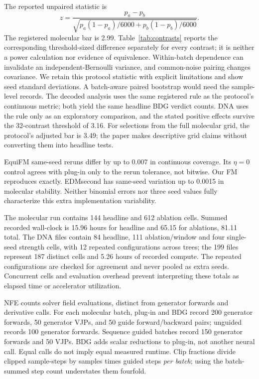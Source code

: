 \documentclass{article}
\begin{document}
The reported unpaired statistic is
\[
 z=\frac{p_a-p_b}{\sqrt{p_a(1-p_a)/6000+p_b(1-p_b)/6000}}.
\]
The registered molecular bar is 2.99. Table~\ref{tab:contrasts} reports the corresponding threshold-sized difference separately for every contrast; it is neither a power calculation nor evidence of equivalence. Within-batch dependence can invalidate an independent-Bernoulli variance, and common-noise pairing changes covariance. We retain this protocol statistic with explicit limitations and show seed standard deviations. A batch-aware paired bootstrap would need the sample-level records. The decoded analysis uses the same registered rule as the protocol's continuous metric; both yield the same headline BDG verdict counts. DNA uses the rule only as an exploratory comparison, and the stated positive effects survive the 32-contrast threshold of 3.16. For selections from the full molecular grid, the protocol's adjusted bar is 3.49; the paper makes descriptive grid claims without converting them into headline tests.

EquiFM same-seed reruns differ by up to 0.007 in continuous coverage. Its $\eta=0$ control agrees with plug-in only to the rerun tolerance, not bitwise. Our FM reproduces exactly. EDMsecond has same-seed variation up to 0.0015 in molecular stability. Neither binomial errors nor three seed values fully characterize this extra implementation variability.

The molecular run contains 144 headline and 612 ablation cells. Summed recorded wall-clock is 15.96 hours for headline and 65.15 for ablations, 81.11 total. The DNA files contain 84 headline, 111 ablation/window and four single-seed strength cells, with 12 repeated configurations across trees; the 199 files represent 187 distinct cells and 5.26 hours of recorded compute. The repeated configurations are checked for agreement and never pooled as extra seeds. Concurrent cells and evaluation overhead prevent interpreting these totals as elapsed time or accelerator utilization.

NFE counts solver field evaluations, distinct from generator forwards and derivative calls. For each molecular batch, plug-in and BDG record 200 generator forwards, 50 generator VJPs, and 50 guide forward/backward pairs; unguided records 100 generator forwards. Sequence guided batches record 150 generator forwards and 50 VJPs. BDG adds scalar reductions to plug-in, not another neural call. Equal calls do not imply equal measured runtime. Clip fractions divide clipped sample-steps by samples times guided steps \emph{per batch}; using the batch-summed step count understates them fourfold.
\end{document}
